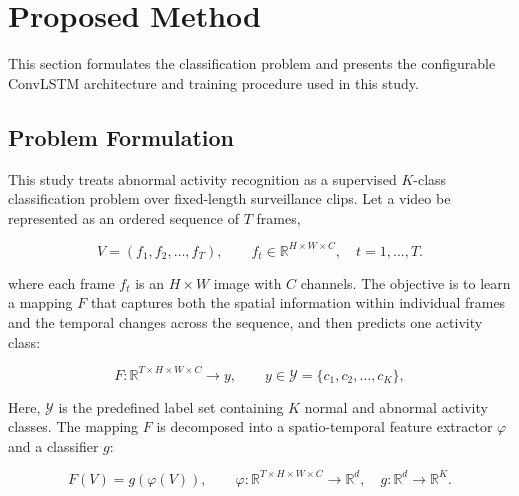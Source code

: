 \documentclass[journal,article,submit,moreauthors]{Definitions/mdpi}
\newcommand{\R}{\mathbb{R}}
\begin{document}
	\section{Proposed Method}
	\label{sec:proposed-method}

    This section formulates the classification problem and presents 
    the configurable ConvLSTM architecture and training procedure 
    used in this study.

    \subsection{Problem Formulation}
    \label{sec:problem-formulation}

    This study treats abnormal activity recognition as a supervised 
    $K$-class classification problem over fixed-length surveillance 
    clips. Let a video be represented as an ordered sequence of 
    $T$ frames,

    \begin{equation}
        V = (f_1, f_2, \ldots, f_T), \qquad f_t \in 
        \R^{H \times W \times C}, \quad t = 1, \ldots, T.
        \label{eq:video}
    \end{equation}

    where each frame $f_t$ is an $H\times W$ image with $C$ channels.
    The objective is to learn a mapping $F$ that captures both the 
    spatial information within individual frames and the temporal
    changes across the sequence, and then predicts one activity class:

    \begin{equation}
        F : \R^{T \times H \times W \times C} \rightarrow y, 
        \qquad y \in \mathcal{Y} = \{c_1, c_2, \ldots, c_K\},
        \label{eq:mapping}
    \end{equation}

    Here, $\mathcal{Y}$ is the predefined label set containing $K$ 
    normal and abnormal activity classes. The mapping $F$ is 
    decomposed into a spatio-temporal feature extractor $\varphi$ 
    and a classifier $g$:

    \begin{equation}
        F(V) = g(\varphi(V)), \qquad \varphi : \R^{T \times H 
        \times W \times C} \rightarrow \R^{d}, \quad g : 
        \R^{d} \rightarrow \R^{K}.
        \label{eq:decomposition}
    \end{equation}
\end{document}
